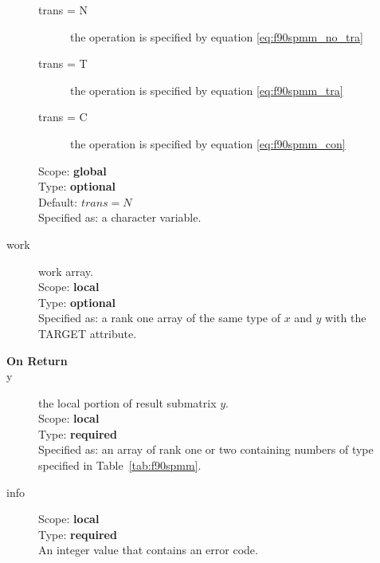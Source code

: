 \begin{description}
\begin{description}
\item[trans = N] the operation is specified by equation \ref{eq:f90spmm_no_tra}
\item[trans = T] the operation is specified by equation
\ref{eq:f90spmm_tra}
\item[trans = C] the operation is specified by equation
\ref{eq:f90spmm_con}
\end{description}
Scope: {\bf global} \\
Type: {\bf optional}\\	
Default: $trans = N$\\	
Specified as: a character variable.

\item[work]  work array.\\
Scope: {\bf local} \\
Type: {\bf optional}\\	
Specified as: a rank one array of the same type of $x$ and $y$ with
the TARGET attribute. 

\item[\bf On Return]
\item[y] the local portion of result submatrix $y$.\\
Scope: {\bf local} \\
Type: {\bf required} \\
Specified as: an array of rank one or two
containing numbers of type specified in
Table~\ref{tab:f90spmm}.
\item[info] 
Scope: {\bf local} \\
Type: {\bf required} \\
An integer value that contains an error code. 
\end{description}

